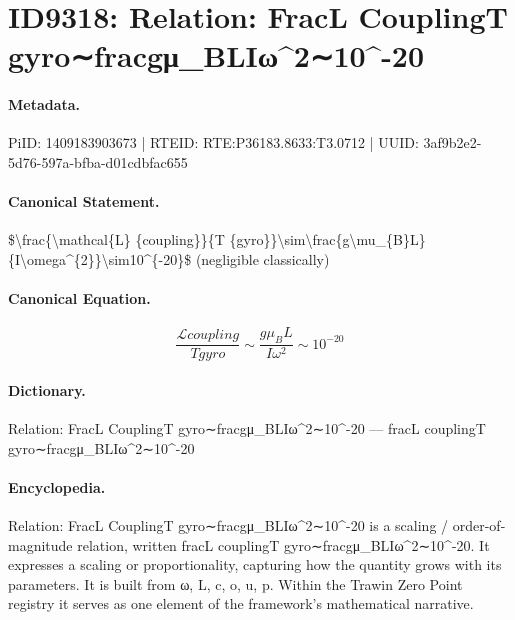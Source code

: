 \section*{ID9318: Relation: FracL CouplingT gyro∼fracgμ\_BLIω\textasciicircum{}2∼10\textasciicircum{}-20}
\paragraph{Metadata.}
PiID: 1409183903673 | RTEID: RTE:P36183.8633:T3.0712 | UUID: 3af9b2e2-5d76-597a-bfba-d01cdbfac655

\paragraph{Canonical Statement.}
\$\textbackslash{}frac\{\textbackslash{}mathcal\{L\} \{coupling\}\}\{T \{gyro\}\}\textbackslash{}sim\textbackslash{}frac\{g\textbackslash{}mu\_\{B\}L\}\{I\textbackslash{}omega\textasciicircum{}\{2\}\}\textbackslash{}sim10\textasciicircum{}\{-20\}\$ (negligible classically)

\paragraph{Canonical Equation.}
\[
\frac{\mathcal{L} {coupling}}{T {gyro}}\sim\frac{g\mu_{B}L}{I\omega^{2}}\sim10^{-20}
\]

\paragraph{Dictionary.}
Relation: FracL CouplingT gyro∼fracgμ\_BLIω\textasciicircum{}2∼10\textasciicircum{}-20 — fracL couplingT gyro∼fracgμ\_BLIω\textasciicircum{}2∼10\textasciicircum{}-20

\paragraph{Encyclopedia.}
Relation: FracL CouplingT gyro∼fracgμ\_BLIω\textasciicircum{}2∼10\textasciicircum{}-20 is a scaling / order-of-magnitude relation, written fracL couplingT gyro∼fracgμ\_BLIω\textasciicircum{}2∼10\textasciicircum{}-20. It expresses a scaling or proportionality, capturing how the quantity grows with its parameters. It is built from ω, L, c, o, u, p. Within the Trawin Zero Point registry it serves as one element of the framework's mathematical narrative.
